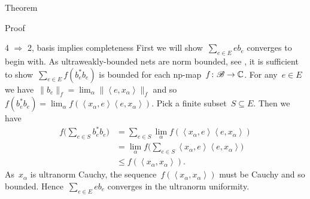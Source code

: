 \documentclass[b]{subfiles}
\begin{document}
\begin{parsec}
\begin{point}{Theorem}
\begin{point}{Proof}
\begin{point}{4 $\Rightarrow$ 2, basis implies completeness}
    First we will show~$\sum_{e \in E} e b_e$ converges to
        begin with.
    As ultraweakly-bounded nets are norm bounded,
    see ,
        it is sufficient to show~$\sum_{e\in E} f( b_e^*b_e ) $ is bounded
        for each np-map~$f\colon \mathscr{B} \to \mathbb{C}$.
    For any~$e \in E$
    we have~$\|b_e\|_f = \lim_\alpha \|\left<e,x_\alpha\right>\|_f$
    and so~$f(b_e^*b_e) =\lim_\alpha f(\left<x_\alpha,e\right> \left<e, x_\alpha\right>)$.
    Pick a finite subset~$S \subseteq E$. Then we have
 \begin{align*}
    f\bigl(\sum_{e \in S} b_e^*b_e\bigr)
    &= \sum_{e \in S} \lim_\alpha 
     f(\left<x_\alpha,e\right> \left<e, x_\alpha\right>) \\
     & = \lim_\alpha 
            f\bigl(\sum_{e \in S}\left<x_\alpha,e\right>
                \left<e, x_\alpha\right>\bigr) \\
            &\leq f(\left<x_\alpha,x_\alpha\right>).
 \end{align*}
As~$x_\alpha$ is ultranorm Cauchy,
the sequence~$f(\left<x_\alpha,x_\alpha\right>)$
    must be Cauchy and so bounded.
Hence~$\sum_{e \in E} e b_e$ converges in the ultranorm uniformity.


\end{point}
\end{point}
\end{point}
\end{parsec}
\end{document}
